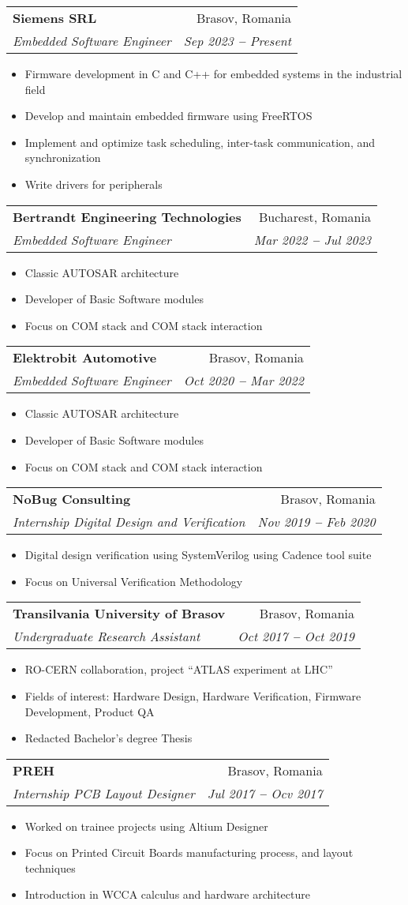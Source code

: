 \documentclass[letterpaper,11pt]{article}
\makeatletter
\newcommand{\resumeItem}[1]{
  \item\small{
    {#1 \vspace{-2pt}}
  }
}
\newcommand{\resumeSubheading}[4]{
  \vspace{-2pt}\item
    \begin{tabular*}{0.97\textwidth}[t]{l@{\extracolsep{\fill}}r}
      \textbf{#1} & #2 \\
      \textit{\small#3} & \textit{\small #4} \\
    \end{tabular*}\vspace{-7pt}
}
\newcommand{\resumeItemListStart}{\begin{itemize}}
\newcommand{\resumeItemListEnd}{\end{itemize}\vspace{-5pt}}
\makeatother
\begin{document}
    \resumeSubheading
      {Siemens SRL}{Brasov, Romania}
      {Embedded Software Engineer}{Sep 2023 \textbf{--} Present}
        \resumeItemListStart
            \resumeItem{Firmware development in C and C++ for embedded systems in the industrial field}
            \resumeItem{Develop and maintain embedded firmware using FreeRTOS}
            \resumeItem{Implement and optimize task scheduling, inter-task communication, and synchronization}
            \resumeItem{Write drivers for peripherals}
            
        \resumeItemListEnd
    
    \resumeSubheading
      {Bertrandt Engineering Technologies}{Bucharest, Romania}
      {Embedded Software Engineer}{Mar 2022 \textbf{--} Jul 2023}
        \resumeItemListStart
            \resumeItem{Classic AUTOSAR architecture}
            \resumeItem{Developer of Basic Software modules}
            \resumeItem{Focus on COM stack and COM stack interaction}
        \resumeItemListEnd

    \resumeSubheading
      {Elektrobit Automotive}{Brasov, Romania}
      {Embedded Software Engineer}{Oct 2020 \textbf{--} Mar 2022}
        \resumeItemListStart
            \resumeItem{Classic AUTOSAR architecture}
            \resumeItem{Developer of Basic Software modules}
            \resumeItem{Focus on COM stack and COM stack interaction}
        \resumeItemListEnd

    \resumeSubheading
      {NoBug Consulting}{Brasov, Romania}
      {Internship Digital Design and Verification}{Nov 2019 \textbf{--} Feb 2020}
        \resumeItemListStart
            \resumeItem{Digital design verification using SystemVerilog using Cadence tool suite}
            \resumeItem{Focus on Universal Verification Methodology}
        \resumeItemListEnd

    \resumeSubheading
      {Transilvania University of Brasov}{Brasov, Romania}
      {Undergraduate Research Assistant}{Oct 2017 \textbf{--} Oct 2019}
        \resumeItemListStart
            \resumeItem{RO-CERN collaboration, project ``ATLAS experiment at LHC''}
            \resumeItem{Fields of interest: Hardware Design, Hardware Verification, Firmware Development, Product QA}
            \resumeItem{Redacted Bachelor's degree Thesis}
        \resumeItemListEnd

    \resumeSubheading
      {PREH}{Brasov, Romania}
      {Internship PCB Layout Designer}{Jul 2017 \textbf{--} Ocv 2017}
        \resumeItemListStart
            \resumeItem{Worked on trainee projects using Altium Designer}
            \resumeItem{Focus on Printed Circuit Boards manufacturing process, and layout techniques}
            \resumeItem{Introduction in WCCA calculus and hardware architecture}
        \resumeItemListEnd
\end{document}
